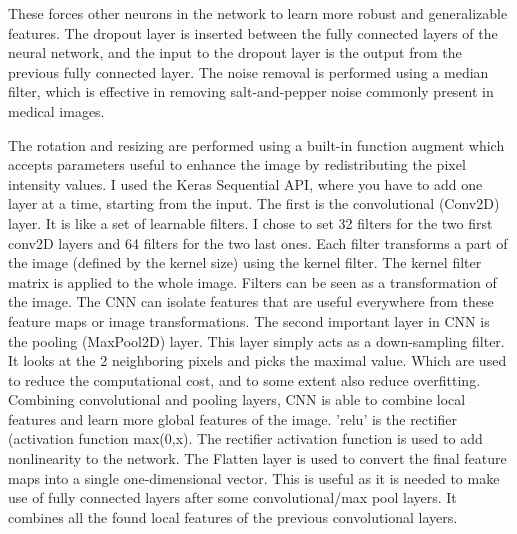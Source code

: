 \documentclass{article}
\begin{document}
These forces other neurons in the network to learn more robust and generalizable features.
The dropout layer is inserted between the fully connected layers of the neural network, and the input to the dropout layer is the output from the previous fully connected layer.
The noise removal is performed using a median filter, which is effective in removing salt-and-pepper noise commonly present in medical images. 

The rotation and resizing are performed using a built-in function augment which accepts parameters useful to enhance the image by redistributing the pixel intensity values. 
I used the Keras Sequential API, where you have to add one layer at a time, starting from the input. The first is the convolutional (Conv2D) layer. It is like a set of learnable filters. I chose to set 32 filters for the two first conv2D layers and 64 filters for the two last ones. Each filter transforms a part of the image (defined by the kernel size) using the kernel filter. The kernel filter matrix is applied to the whole image. Filters can be seen as a transformation of the image. The CNN can isolate features that are useful everywhere from these feature maps or image transformations.
The second important layer in CNN is the pooling (MaxPool2D) layer. This layer simply acts as a down-sampling filter. It looks at the 2 neighboring pixels and picks the maximal value. Which are used to reduce the computational cost, and to some extent also reduce overfitting. 
Combining convolutional and pooling layers, CNN is able to combine local features and learn more global features of the image.
'relu' is the rectifier (activation function max(0,x). The rectifier activation function is used to add nonlinearity to the network.
The Flatten layer is used to convert the final feature maps into a single one-dimensional vector. This is useful as it is needed to make use of fully connected layers after some convolutional/max pool layers. It combines all the found local features of the previous convolutional layers.


\newcommand{\grad}{\nabla_\theta L(\theta)}
\newcommand{\mt}{m_t}
\newcommand{\vt}{v_t}
\newcommand{\mhat}{\hat{m}_t}
\newcommand{\vhat}{\hat{v}_t}
\newcommand{\eps}{\epsilon}
\newcommand{\lr}{\alpha}
\newcommand{\betaone}{\beta_1}
\newcommand{\betatwo}{\beta_2}
\end{document}
